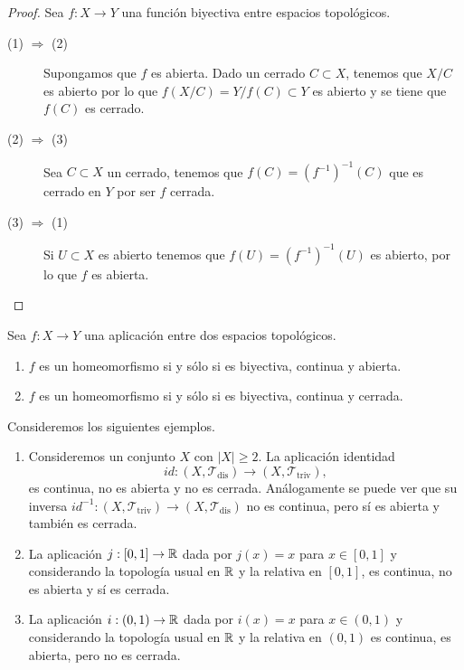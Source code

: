 \begin{proof}
Sea $\displaystyle f : X \to Y $ una función biyectiva entre espacios topológicos. 
\begin{description}
\item[(1) $\displaystyle \Rightarrow $ (2)] Supongamos que $\displaystyle f $ es abierta. Dado un cerrado $\displaystyle C \subset X $, tenemos que $\displaystyle X / C $ es abierto por lo que $\displaystyle f\left(X/C\right)=Y/f\left(C\right)\subset Y $ es abierto y se tiene que $\displaystyle f\left(C\right) $ es cerrado. 
\item[(2) $\displaystyle \Rightarrow $ (3)] Sea $\displaystyle C \subset X $ un cerrado, tenemos que $\displaystyle f\left(C\right)=\left(f^{-1}\right)^{-1}\left(C\right) $ que es cerrado en $\displaystyle Y $ por ser $\displaystyle f $ cerrada.
\item[(3) $\displaystyle \Rightarrow $ (1)] Si $\displaystyle U \subset X$ es abierto tenemos que $\displaystyle f\left(U\right)=\left(f^{-1}\right)^{-1}\left(U\right) $ es abierto, por lo que $\displaystyle f $ es abierta. 
\end{description}
\end{proof}
\begin{prop}
Sea $\displaystyle f : X \to Y $ una aplicación entre dos espacios topológicos.
\begin{enumerate}
\item $\displaystyle f $ es un homeomorfismo si y sólo si es biyectiva, continua y abierta. 
\item $\displaystyle f $ es un homeomorfismo si y sólo si es biyectiva, continua y cerrada.
\end{enumerate}
\end{prop}
\begin{eg}
Consideremos los siguientes ejemplos. 
\begin{enumerate}
\item Consideremos un conjunto $\displaystyle X $ con $\displaystyle \left|X\right|\geq 2 $. La aplicación identidad
	\[id : \left(X, \mathcal{T}_{\text{dis}}\right)\to \left(X, \mathcal{T}_{\text{triv}}\right) ,\]
	es continua, no es abierta y no es cerrada. Análogamente se puede ver que su inversa $\displaystyle id^{-1} : \left(X, \mathcal{T}_{\text{triv}}\right)\to \left(X, \mathcal{T}_{\text{dis}}\right) $ no es continua, pero sí es abierta y también es cerrada.
\item La aplicación $\displaystyle j : \left[0,1\right] \to \mathbb{R} $ dada por $\displaystyle j\left(x\right)=x $ para $\displaystyle x \in \left[0,1\right]  $ y considerando la topología usual en $\displaystyle \mathbb{R} $ y la relativa en $\displaystyle \left[0,1\right]  $, es continua, no es abierta y sí es cerrada.
\item La aplicación $\displaystyle i : \left(0,1\right)\to \mathbb{R} $ dada por $\displaystyle i\left(x\right)=x $ para $\displaystyle x \in \left(0,1\right) $ y considerando la topología usual en $\displaystyle \mathbb{R} $ y la relativa en $\displaystyle \left(0,1\right) $ es continua, es abierta, pero no es cerrada. 
\end{enumerate}
\end{eg}

